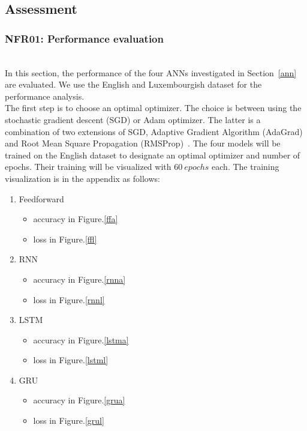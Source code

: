 
\subsection{Assessment}
\subsubsection{NFR01: Performance evaluation}~\\

In this section, the performance of the four ANNs investigated in
Section~\ref{ann} are evaluated. We use the English and Luxembourgish dataset
for the performance analysis.\\

The first step is to choose an optimal optimizer. The choice is between using
the stochastic gradient descent (SGD) or Adam optimizer. The latter is a
combination of two extensions of SGD, Adaptive Gradient Algorithm (AdaGrad) and
Root Mean Square Propagation (RMSProp)~\cite{Adam}. The four models will be
trained on the English dataset to designate an optimal optimizer and number of
epochs. Their training will be visualized with $60\ epochs$ each. The training
visualization is in the appendix as follows:\\

\begin{enumerate}[label=\arabic*.]
  \item Feedforward
    \begin{itemize}
      \item accuracy in Figure.\ref{ffa}
      \item loss in Figure.\ref{ffl}
    \end{itemize}
  \item RNN
    \begin{itemize}
      \item accuracy in Figure.\ref{rnna}
      \item loss in Figure.\ref{rnnl}
    \end{itemize}
  \item LSTM
    \begin{itemize}
      \item accuracy in Figure.\ref{lstma}
      \item loss in Figure.\ref{lstml}
    \end{itemize}
  \item GRU
    \begin{itemize}
      \item accuracy in Figure.\ref{grua}
      \item loss in Figure.\ref{grul}
    \end{itemize}
\end{enumerate}~\\

